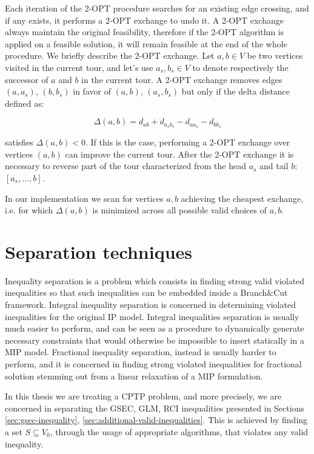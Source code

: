 Each iteration of the 2-OPT procedure searches for an existing edge crossing, and if any exists, it performs a 2-OPT exchange to undo it.
A 2-OPT exchange always maintain the original feasibility, therefore if the 2-OPT algorithm is applied on a feasible solution, it will remain feasible at the end of the whole procedure.
We briefly describe the 2-OPT exchange.
Let $a, b \in V$ be two vertices visited in the current tour, and let's use $a_s, b_s \in V$ to denote respectively the successor of $a$ and $b$ in the current tour.
A 2-OPT exchange removes edges $(a, a_s)$, $(b, b_s)$ in favor of $(a, b)$, $(a_s, b_s)$ but only if the delta distance defined as:

\begin{equation}
	\Delta(a, b) = d_{ab} + d_{a_sb_s} - d_{aa_s} - d_{bb_s}
\end{equation}

satisfies $\Delta(a, b) < 0$.
If this is the case, performing a 2-OPT exchange over vertices $(a, b)$ can improve the current tour.
After the 2-OPT exchange it is necessary to reverse part of the tour characterized from the head $a_s$ and tail $b$: $[a_s, \dots, b]$.

In our implementation we scan for vertices $a, b$ achieving the cheapest exchange, i.e. for which $\Delta(a, b)$ is minimized across all possible valid choices of $a, b$.


\section{Separation techniques}

Inequality separation is a problem which consists in finding strong valid violated inequalities so that such inequalities can be embedded inside a Branch\&Cut framework.
Integral inequality separation is concerned in determining violated inequalities for the original IP model.
Integral inequalities separation is usually much easier to perform, and can be seen as a procedure to dynamically generate necessary constraints that would otherwise be impossible to insert statically in a MIP model.
Fractional inequality separation, instead is usually harder to perform, and it is concerned in finding strong violated inequalities for fractional solution stemming out from a linear relaxation of a MIP formulation.

In this thesis we are treating a CPTP problem, and more precisely, we are concerned in separating the GSEC, GLM, RCI inequalities presented in Sections \ref{sec:gsec-inequality}, \ref{sec:additional-valid-inequalities}.
This is achieved by finding a set $S \subseteq V_0$, through the usage of appropriate algorithms, that violates any valid inequality.

